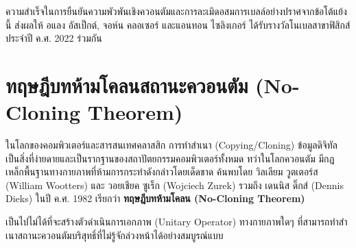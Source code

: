 ความสำเร็จในการยืนยันความพัวพันเชิงควอนตัมและการละเมิดอสมการเบลล์อย่างปราศจากข้อโต้แย้งนี้ ส่งผลให้ อแลง อัสเป็กต์, จอห์น คลอเซอร์ และแอนทอน ไซลิงเกอร์ ได้รับรางวัลโนเบลสาขาฟิสิกส์ประจำปี ค.ศ. 2022 ร่วมกัน

\section{ทฤษฎีบทห้ามโคลนสถานะควอนตัม (No-Cloning Theorem)}

ในโลกของคอมพิวเตอร์และสารสนเทศคลาสสิก การทำสำเนา (Copying/Cloning) ข้อมูลดิจิทัลเป็นสิ่งที่ง่ายดายและเป็นรากฐานของสถาปัตยกรรมคอมพิวเตอร์ทั้งหมด ทว่าในโลกควอนตัม มีกฎเหล็กพื้นฐานทางกายภาพที่ห้ามการกระทำดังกล่าวโดยเด็ดขาด ค้นพบโดย วิลเลียม วูตเตอร์ส (William Wootters) และ วอยเชียค ซูเร็ก (Wojciech Zurek) รวมถึง เดนนิส ดิ๊กส์ (Dennis Dieks) ในปี ค.ศ. 1982 เรียกว่า \textbf{ทฤษฎีบทห้ามโคลน (No-Cloning Theorem)}

\begin{tcolorbox}[colback=rbruLightBg, colframe=darkNavy, arc=2mm, title=\textbf{ทฤษฎีบท ---- การห้ามโคลนสถานะควอนตัมที่ไม่รู้จัก (No-Cloning Theorem)}]
เป็นไปไม่ได้ที่จะสร้างตัวดำเนินการเอกภาพ (Unitary Operator) ทางกายภาพใดๆ ที่สามารถทำสำเนาสถานะควอนตัมบริสุทธิ์ที่ไม่รู้จักล่วงหน้าได้อย่างสมบูรณ์แบบ
\end{tcolorbox}

